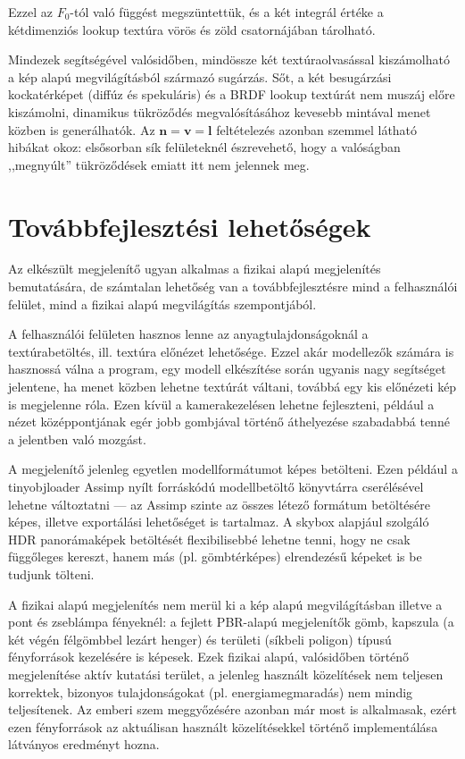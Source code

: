 Ezzel az \(F_0\)-tól való függést megszüntettük, és a két integrál értéke a kétdimenziós lookup textúra vörös és zöld csatornájában tárolható.

Mindezek segítségével valósidőben, mindössze két textúraolvasással kiszámolható a kép alapú megvilágításból származó sugárzás. Sőt, a két besugárzási kockatérképet (diffúz és spekuláris) és a BRDF lookup textúrát nem muszáj előre kiszámolni, dinamikus tükröződés megvalósításához kevesebb mintával menet közben is generálhatók. Az \(\mathbf{n} = \mathbf{v} = \mathbf{l}\) feltételezés azonban szemmel látható hibákat okoz: elsősorban sík felületeknél észrevehető, hogy a valóságban ,,megnyúlt'' tükröződések emiatt itt nem jelennek meg.

\section{Továbbfejlesztési lehetőségek}
\label{sec:further_dev}

Az elkészült megjelenítő ugyan alkalmas a fizikai alapú megjelenítés bemutatására, de számtalan lehetőség van a továbbfejlesztésre mind a felhasználói felület, mind a fizikai alapú megvilágítás szempontjából.

A felhasználói felületen hasznos lenne az anyagtulajdonságoknál a textúrabetöltés, ill. textúra előnézet lehetősége. Ezzel akár modellezők számára is hasznossá válna a program, egy modell elkészítése során ugyanis nagy segítséget jelentene, ha menet közben lehetne textúrát váltani, továbbá egy kis előnézeti kép is megjelenne róla. Ezen kívül a kamerakezelésen lehetne fejleszteni, például a nézet középpontjának egér jobb gombjával történő áthelyezése szabadabbá tenné a jelentben való mozgást.

A megjelenítő jelenleg egyetlen modellformátumot képes betölteni. Ezen például a tinyobjloader Assimp nyílt forráskódú modellbetöltő könyvtárra cserélésével lehetne változtatni --- az Assimp szinte az összes létező formátum betöltésére képes, illetve exportálási lehetőséget is tartalmaz. A skybox alapjául szolgáló HDR panorámaképek betöltését flexibilisebbé lehetne tenni, hogy ne csak függőleges kereszt, hanem más (pl. gömbtérképes) elrendezésű képeket is be tudjunk tölteni.

A fizikai alapú megjelenítés nem merül ki a kép alapú megvilágításban illetve a pont és zseblámpa fényeknél: a fejlett PBR-alapú megjelenítők gömb, kapszula (a két végén félgömbbel lezárt henger) és területi (síkbeli poligon) típusú fényforrások kezelésére is képesek. Ezek fizikai alapú, valósidőben történő megjelenítése aktív kutatási terület, a jelenleg használt közelítések nem teljesen korrektek, bizonyos tulajdonságokat (pl. energiamegmaradás) nem mindig teljesítenek. Az emberi szem meggyőzésére azonban már most is alkalmasak, ezért ezen fényforrások az aktuálisan használt közelítésekkel történő implementálása látványos eredményt hozna.


